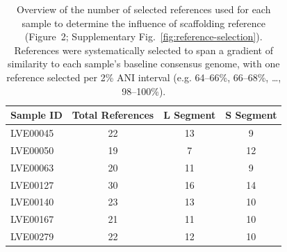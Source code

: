 \begin{table}[htbp]
    \centering
    \caption{Overview of the number of selected references used for each sample to determine the influence of scaffolding reference (Figure~2; Supplementary Fig.~\ref{fig:reference-selection}). References were systematically selected to span a gradient of similarity to each sample's baseline consensus genome, with one reference selected per 2\% ANI interval (e.g. 64--66\%, 66--68\%, \ldots, 98--100\%).}
    \label{table:n_references}
    \begin{tabular}{lccc}
        \toprule
        \textbf{Sample ID} & \textbf{Total References} & \textbf{L Segment} & \textbf{S Segment} \\
        \midrule
        LVE00045 & 22 & 13 & 9 \\
        LVE00050 & 19 & 7 & 12 \\
        LVE00063 & 20 & 11 & 9 \\
        LVE00127 & 30 & 16 & 14 \\
        LVE00140 & 23 & 13 & 10 \\
        LVE00167 & 21 & 11 & 10 \\
        LVE00279 & 22 & 12 & 10 \\
        \bottomrule
    \end{tabular}
\end{table}

